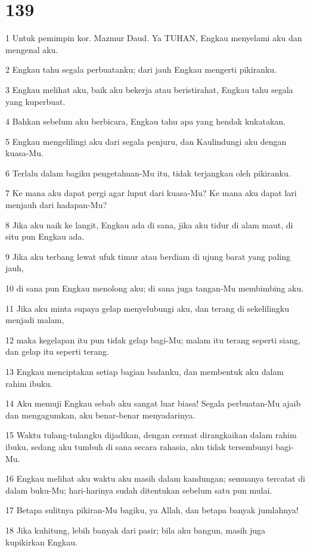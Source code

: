 \chapter{139}

\par 1 Untuk pemimpin kor. Mazmur Daud. Ya TUHAN, Engkau menyelami aku dan mengenal aku.
\par 2 Engkau tahu segala perbuatanku; dari jauh Engkau mengerti pikiranku.
\par 3 Engkau melihat aku, baik aku bekerja atau beristirahat, Engkau tahu segala yang kuperbuat.
\par 4 Bahkan sebelum aku berbicara, Engkau tahu apa yang hendak kukatakan.
\par 5 Engkau mengelilingi aku dari segala penjuru, dan Kaulindungi aku dengan kuasa-Mu.
\par 6 Terlalu dalam bagiku pengetahuan-Mu itu, tidak terjangkau oleh pikiranku.
\par 7 Ke mana aku dapat pergi agar luput dari kuasa-Mu? Ke mana aku dapat lari menjauh dari hadapan-Mu?
\par 8 Jika aku naik ke langit, Engkau ada di sana, jika aku tidur di alam maut, di situ pun Engkau ada.
\par 9 Jika aku terbang lewat ufuk timur atau berdiam di ujung barat yang paling jauh,
\par 10 di sana pun Engkau menolong aku; di sana juga tangan-Mu membimbing aku.
\par 11 Jika aku minta supaya gelap menyelubungi aku, dan terang di sekelilingku menjadi malam,
\par 12 maka kegelapan itu pun tidak gelap bagi-Mu; malam itu terang seperti siang, dan gelap itu seperti terang.
\par 13 Engkau menciptakan setiap bagian badanku, dan membentuk aku dalam rahim ibuku.
\par 14 Aku memuji Engkau sebab aku sangat luar biasa! Segala perbuatan-Mu ajaib dan mengagumkan, aku benar-benar menyadarinya.
\par 15 Waktu tulang-tulangku dijadikan, dengan cermat dirangkaikan dalam rahim ibuku, sedang aku tumbuh di sana secara rahasia, aku tidak tersembunyi bagi-Mu.
\par 16 Engkau melihat aku waktu aku masih dalam kandungan; semuanya tercatat di dalam buku-Mu; hari-harinya sudah ditentukan sebelum satu pun mulai.
\par 17 Betapa sulitnya pikiran-Mu bagiku, ya Allah, dan betapa banyak jumlahnya!
\par 18 Jika kuhitung, lebih banyak dari pasir; bila aku bangun, masih juga kupikirkan Engkau.
